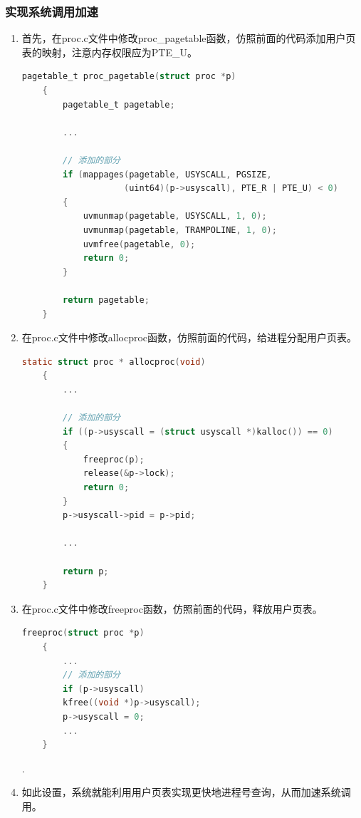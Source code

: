 \subsubsection{实现系统调用加速}
\begin{enumerate}
    \item 首先，在proc.c文件中修改proc\_pagetable函数，仿照前面的代码添加用户页表的映射，注意内存权限应为PTE\_U。
          \begin{lstlisting}[language=c, title=对proc\_pagetable函数的修改]
    pagetable_t proc_pagetable(struct proc *p)
    {
        pagetable_t pagetable;

        ...

        // 添加的部分
        if (mappages(pagetable, USYSCALL, PGSIZE,
                    (uint64)(p->usyscall), PTE_R | PTE_U) < 0)
        {
            uvmunmap(pagetable, USYSCALL, 1, 0);
            uvmunmap(pagetable, TRAMPOLINE, 1, 0);
            uvmfree(pagetable, 0);
            return 0;
        }

        return pagetable;
    }
    \end{lstlisting}
    \item 在proc.c文件中修改allocproc函数，仿照前面的代码，给进程分配用户页表。
          \begin{lstlisting}[language=c, title=对allocproc函数的修改]
    static struct proc * allocproc(void)
    {
        ...
    
        // 添加的部分
        if ((p->usyscall = (struct usyscall *)kalloc()) == 0)
        {
            freeproc(p);
            release(&p->lock);
            return 0;
        }
        p->usyscall->pid = p->pid;
    
        ...

        return p;
    }
    \end{lstlisting}
    \item 在proc.c文件中修改freeproc函数，仿照前面的代码，释放用户页表。
          \begin{lstlisting}[language=c, title=对freeproc函数的修改]
    freeproc(struct proc *p)
    {
        ...
        // 添加的部分
        if (p->usyscall)
        kfree((void *)p->usyscall);
        p->usyscall = 0;
        ...
    }
    \end{lstlisting}.
    \item 如此设置，系统就能利用用户页表实现更快地进程号查询，从而加速系统调用。
\end{enumerate}

